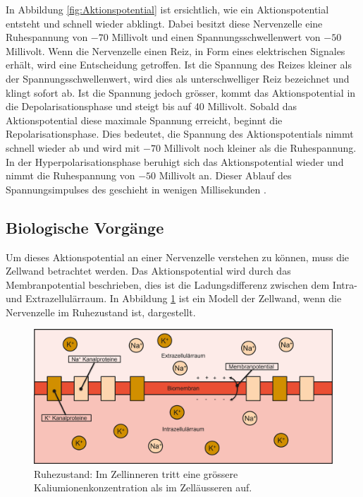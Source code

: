\begin{refsection}
In Abbildung \ref{fig:Aktionspotential} ist ersichtlich, wie ein Aktionspotential entsteht und schnell wieder abklingt.
Dabei besitzt diese Nervenzelle eine Ruhespannung von $-70$ Millivolt und einen Spannungsschwellenwert von $-50$ Millivolt.
Wenn die Nervenzelle einen Reiz, in Form eines elektrischen Signales erhält, wird eine Entscheidung getroffen. 
Ist die Spannung des Reizes kleiner als der Spannungsschwellenwert, wird dies als unterschwelliger Reiz bezeichnet und klingt sofort ab.
Ist die Spannung jedoch grösser, kommt das Aktionspotential in die Depolarisationsphase und steigt bis auf 40 Millivolt.
Sobald das Aktionspotential diese maximale Spannung erreicht, beginnt die Repolarisationsphase.
Dies bedeutet, die Spannung des Aktionspotentials nimmt schnell wieder ab und wird mit $-70$ Millivolt noch kleiner als die Ruhespannung.
In der Hyperpolarisationsphase beruhigt sich das Aktionspotential wieder und nimmt die Ruhespannung von $-50$ Millivolt an.
Dieser Ablauf des Spannungsimpulses des geschieht in wenigen Millisekunden 
\cite{nerven:InaLammers.31.08.2015}.

\subsection{Biologische Vorgänge}
Um dieses Aktionspotential an einer Nervenzelle verstehen zu können, muss die Zellwand betrachtet werden. 
Das Aktionspotential wird durch das Membranpotential beschrieben, dies ist die Ladungsdifferenz zwischen dem Intra- und
Extrazellulärraum.
In Abbildung \ref{fig:Ruhezustand} ist ein Modell der Zellwand, wenn die Nervenzelle im Ruhezustand ist, dargestellt.
\begin{figure}[h]
    \centering
    \includegraphics[width=\textwidth]{papers/nerven/Bilder/Vorgang1.png}
    \caption{Ruhezustand: Im Zellinneren tritt eine grössere Kaliumionenkonzentration als im Zelläusseren auf.}
    \label{fig:Ruhezustand}
\end{figure}


\end{refsection}
